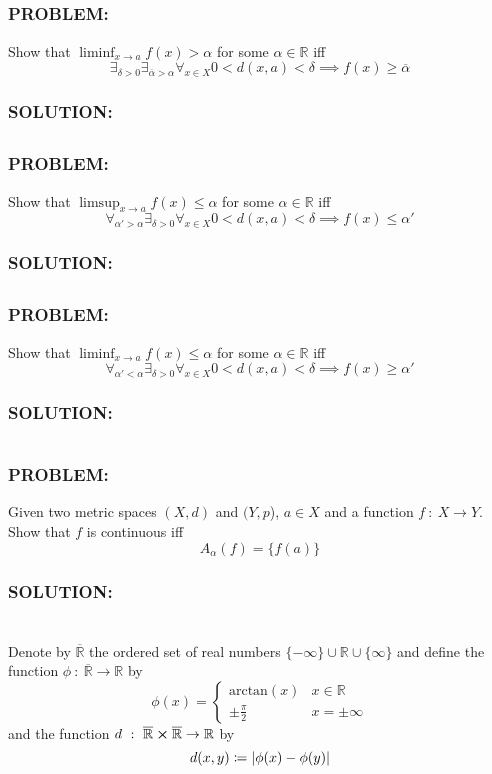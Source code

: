 \documentclass[]{article}
\newcommand{\Problem}{\subsubsection*{\textbf{PROBLEM:}}}
\newcommand{\Solution}{\subsubsection*{\textbf{SOLUTION:}}}
\newcommand{\R}{\mathbb{R}}
\newcommand{\st}{\ : \ }
\begin{document}
\subsection{}
\Problem
Show that $\liminf_{x \to a} f(x) > \alpha$ for some $\alpha \in \R$ iff \[
    \exists_{\delta>0} \exists_{\overline{\alpha} > \alpha} \forall_{x \in X} 0 < d(x,a) < \delta \implies f(x) \geq \overline{\alpha}
\]
\Solution






\subsection{}
\Problem
Show that $\limsup_{x \to a} f(x) \leq \alpha$ for some $\alpha \in \R$ iff \[
    \forall_{\alpha' > \alpha} \exists_{\delta>0} \forall_{x \in X} 0 < d(x,a) < \delta \implies f(x) \leq \alpha'
\]
\Solution






\subsection{}
\Problem
Show that $\liminf_{x \to a} f(x) \leq \alpha$ for some $\alpha \in \R$ iff \[
    \forall_{\alpha' < \alpha} \exists_{\delta>0} \forall_{x \in X}  0 < d(x,a) < \delta \implies f(x) \geq \alpha'
\]
\Solution


\newpage
\section{}
\Problem
Given two metric spaces $(X,d)$ and $(Y,p$), $a \in X$ and a function $f \st X \to Y$.
Show that $f$ is continuous iff \[
    A_\alpha(f) = \{f(a)\}
\]
\Solution




\newpage
\section{}
Denote by $\overline{\mathbb{R}}$ the ordered set of real numbers $\{-\infty\} \cup \R \cup \{\infty\}$ and define the function $\phi \st \overline{\mathbb{R}} \to \R$ by \[
    \phi(x) = \begin{cases}
        \text{arctan}(x) & x \in \R\\
        \pm \frac{\pi}{2} & x = \pm \infty
    \end{cases}
\] and the function $d \st \overline{\R} \cross \overline{\R} \to \R$ by \[
    d(x,y) \coloneqq \abs{\phi(x) - \phi(y)}
\]
\end{document}

